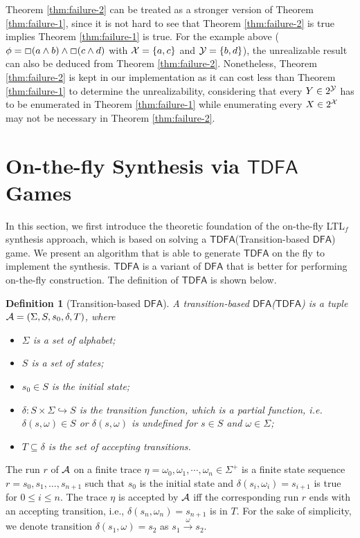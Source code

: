 \documentclass[letterpaper]{article} %
\newcommand{\ltlf}{\textsf{LTL}$_f$\xspace}
\newtheorem{definition}{Definition}
\newcommand{\tran}[1]{\xrightarrow[]{#1}}
\def\dfa{$\mathsf{DFA}$\xspace}
\def\tdfa{$\mathsf{TDFA}$\xspace}
\begin{document}
Theorem \ref{thm:failure-2} can be treated as a stronger version of Theorem \ref{thm:failure-1}, since it is not hard to see that Theorem \ref{thm:failure-2} is true implies Theorem \ref{thm:failure-1} is true. For the example above ($\phi= \Box (a\wedge b)\wedge \Box (c\wedge d)$ with $\mathcal{X}=\{a,c\}$ and $\mathcal{Y}=\{b,d\}$), the unrealizable result can also be deduced from Theorem \ref{thm:failure-2}. Nonetheless, Theorem \ref{thm:failure-2} is kept in our implementation as it can cost less than Theorem \ref{thm:failure-1} to determine the unrealizability, considering that every $Y\in 2^{\mathcal{Y}}$ has to be enumerated in Theorem \ref{thm:failure-1} while enumerating every $X\in 2^{\mathcal{X}}$ may not be necessary in Theorem \ref{thm:failure-2}.
\fi

\section{On-the-fly Synthesis via \tdfa Games}
In this section, we first introduce the theoretic foundation of the on-the-fly \ltlf synthesis approach, which is based on solving a \tdfa (Transition-based \dfa) game. We present an algorithm that is able to generate \tdfa on the fly to implement the synthesis. \tdfa is a variant of \dfa that is better for performing on-the-fly construction. The definition of \tdfa is shown below. 
 
\begin{definition}[Transition-based \dfa]\label{def:tdfa}
A transition-based \dfa (\tdfa) is a tuple $\mathcal{A} = (\Sigma,S,s_0,\delta,T)$, where 
\begin{itemize}
    \item $\Sigma$ is a set of alphabet;
    \item $S$ is a set of states;
    \item $s_0\in S$ is the initial state;
    \item $\delta:S\times\Sigma\hookrightarrow S$ is the transition function, which is a partial function, i.e. $\delta (s, \omega)\in S$ or $\delta (s, \omega)$ is undefined for $s\in S$ and $\omega\in {\Sigma}$;
    \item $T \subseteq \delta$ is the set of accepting transitions.
\end{itemize}
\end{definition}

The run $r$ of $\mathcal{A}$ on a finite trace $\eta=\omega_0, \omega_1,\cdots, \omega_n \in \Sigma^+$ is a finite state sequence $r = s_0,s_1,\ldots,s_{n+1}$ such that $s_0$ is the initial state and $\delta (s_i, \omega_i) = s_{i+1}$ is true for $0\leq i \leq n$.
The trace $\eta$ is accepted by $\mathcal{A}$ iff the corresponding run $r$ ends with an accepting transition, i.e., $\delta (s_n, \omega_n) = s_{n+1}$ is in $T$. For the sake of simplicity, we denote transition $\delta (s_1, \omega) = s_2$ as $s_1\tran{\omega}s_2$.
\end{document}
